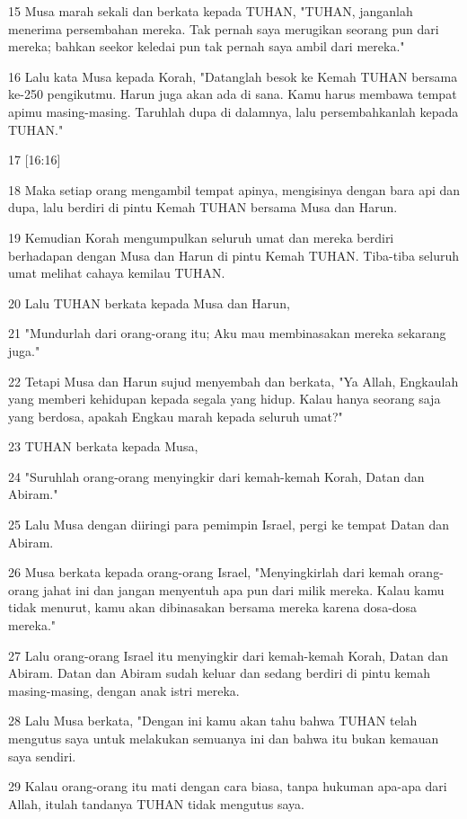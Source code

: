 \par 15 Musa marah sekali dan berkata kepada TUHAN, "TUHAN, janganlah menerima persembahan mereka. Tak pernah saya merugikan seorang pun dari mereka; bahkan seekor keledai pun tak pernah saya ambil dari mereka."
\par 16 Lalu kata Musa kepada Korah, "Datanglah besok ke Kemah TUHAN bersama ke-250 pengikutmu. Harun juga akan ada di sana. Kamu harus membawa tempat apimu masing-masing. Taruhlah dupa di dalamnya, lalu persembahkanlah kepada TUHAN."
\par 17 [16:16]
\par 18 Maka setiap orang mengambil tempat apinya, mengisinya dengan bara api dan dupa, lalu berdiri di pintu Kemah TUHAN bersama Musa dan Harun.
\par 19 Kemudian Korah mengumpulkan seluruh umat dan mereka berdiri berhadapan dengan Musa dan Harun di pintu Kemah TUHAN. Tiba-tiba seluruh umat melihat cahaya kemilau TUHAN.
\par 20 Lalu TUHAN berkata kepada Musa dan Harun,
\par 21 "Mundurlah dari orang-orang itu; Aku mau membinasakan mereka sekarang juga."
\par 22 Tetapi Musa dan Harun sujud menyembah dan berkata, "Ya Allah, Engkaulah yang memberi kehidupan kepada segala yang hidup. Kalau hanya seorang saja yang berdosa, apakah Engkau marah kepada seluruh umat?"
\par 23 TUHAN berkata kepada Musa,
\par 24 "Suruhlah orang-orang menyingkir dari kemah-kemah Korah, Datan dan Abiram."
\par 25 Lalu Musa dengan diiringi para pemimpin Israel, pergi ke tempat Datan dan Abiram.
\par 26 Musa berkata kepada orang-orang Israel, "Menyingkirlah dari kemah orang-orang jahat ini dan jangan menyentuh apa pun dari milik mereka. Kalau kamu tidak menurut, kamu akan dibinasakan bersama mereka karena dosa-dosa mereka."
\par 27 Lalu orang-orang Israel itu menyingkir dari kemah-kemah Korah, Datan dan Abiram. Datan dan Abiram sudah keluar dan sedang berdiri di pintu kemah masing-masing, dengan anak istri mereka.
\par 28 Lalu Musa berkata, "Dengan ini kamu akan tahu bahwa TUHAN telah mengutus saya untuk melakukan semuanya ini dan bahwa itu bukan kemauan saya sendiri.
\par 29 Kalau orang-orang itu mati dengan cara biasa, tanpa hukuman apa-apa dari Allah, itulah tandanya TUHAN tidak mengutus saya.
